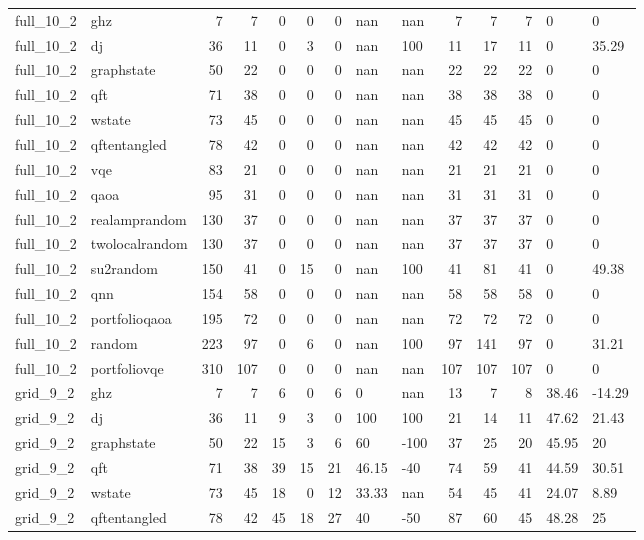 \begin{longtable}{llrrrrrllrrrll}
full\_10\_2 & ghz & 7 & 7 & 0 & 0 & 0 & nan & nan & 7 & 7 & 7 & 0 & 0 \\
full\_10\_2 & dj & 36 & 11 & 0 & 3 & 0 & nan & 100 & 11 & 17 & 11 & 0 & 35.29 \\
full\_10\_2 & graphstate & 50 & 22 & 0 & 0 & 0 & nan & nan & 22 & 22 & 22 & 0 & 0 \\
full\_10\_2 & qft & 71 & 38 & 0 & 0 & 0 & nan & nan & 38 & 38 & 38 & 0 & 0 \\
full\_10\_2 & wstate & 73 & 45 & 0 & 0 & 0 & nan & nan & 45 & 45 & 45 & 0 & 0 \\
full\_10\_2 & qftentangled & 78 & 42 & 0 & 0 & 0 & nan & nan & 42 & 42 & 42 & 0 & 0 \\
full\_10\_2 & vqe & 83 & 21 & 0 & 0 & 0 & nan & nan & 21 & 21 & 21 & 0 & 0 \\
full\_10\_2 & qaoa & 95 & 31 & 0 & 0 & 0 & nan & nan & 31 & 31 & 31 & 0 & 0 \\
full\_10\_2 & realamprandom & 130 & 37 & 0 & 0 & 0 & nan & nan & 37 & 37 & 37 & 0 & 0 \\
full\_10\_2 & twolocalrandom & 130 & 37 & 0 & 0 & 0 & nan & nan & 37 & 37 & 37 & 0 & 0 \\
full\_10\_2 & su2random & 150 & 41 & 0 & 15 & 0 & nan & 100 & 41 & 81 & 41 & 0 & 49.38 \\
full\_10\_2 & qnn & 154 & 58 & 0 & 0 & 0 & nan & nan & 58 & 58 & 58 & 0 & 0 \\
full\_10\_2 & portfolioqaoa & 195 & 72 & 0 & 0 & 0 & nan & nan & 72 & 72 & 72 & 0 & 0 \\
full\_10\_2 & random & 223 & 97 & 0 & 6 & 0 & nan & 100 & 97 & 141 & 97 & 0 & 31.21 \\
full\_10\_2 & portfoliovqe & 310 & 107 & 0 & 0 & 0 & nan & nan & 107 & 107 & 107 & 0 & 0 \\
grid\_9\_2 & ghz & 7 & 7 & 6 & 0 & 6 & 0 & nan & 13 & 7 & 8 & 38.46 & -14.29 \\
grid\_9\_2 & dj & 36 & 11 & 9 & 3 & 0 & 100 & 100 & 21 & 14 & 11 & 47.62 & 21.43 \\
grid\_9\_2 & graphstate & 50 & 22 & 15 & 3 & 6 & 60 & -100 & 37 & 25 & 20 & 45.95 & 20 \\
grid\_9\_2 & qft & 71 & 38 & 39 & 15 & 21 & 46.15 & -40 & 74 & 59 & 41 & 44.59 & 30.51 \\
grid\_9\_2 & wstate & 73 & 45 & 18 & 0 & 12 & 33.33 & nan & 54 & 45 & 41 & 24.07 & 8.89 \\
grid\_9\_2 & qftentangled & 78 & 42 & 45 & 18 & 27 & 40 & -50 & 87 & 60 & 45 & 48.28 & 25 \\

\end{longtable}
